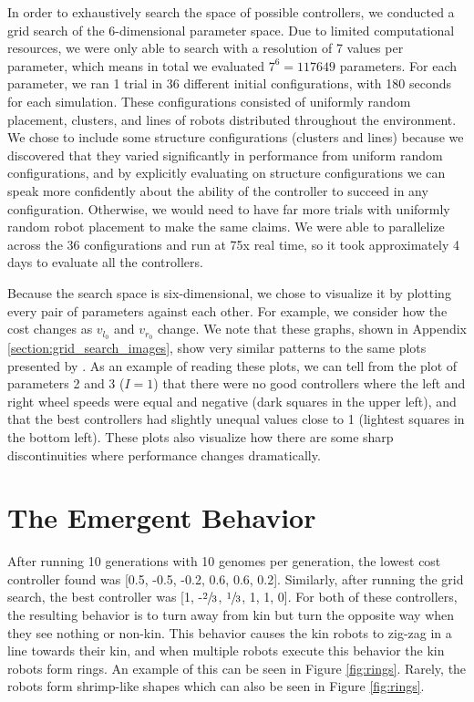 \documentclass[conference]{IEEEtran}
\begin{document}
    In order to exhaustively search the space of possible controllers, we conducted a grid search of the 6-dimensional parameter space. Due to limited computational resources, we were only able to search with a resolution of 7 values per parameter, which means in total we evaluated $7^6=117649$ parameters. For each parameter, we ran 1 trial in 36 different initial configurations, with 180 seconds for each simulation. These configurations consisted of uniformly random placement, clusters, and lines of robots distributed throughout the environment. We chose to include some structure configurations (clusters and lines) because we discovered that they varied significantly in performance from uniform random configurations, and by explicitly evaluating on structure configurations we can speak more confidently about the ability of the controller to succeed in any configuration. Otherwise, we would need to have far more trials with uniformly random robot placement to make the same claims. We were able to parallelize across the 36 configurations and run at 75x real time, so it took approximately 4 days to evaluate all the controllers.

    Because the search space is six-dimensional, we chose to visualize it by plotting every pair of parameters against each other. For example, we consider how the cost changes as $v_{l_0}$ and $v_{r_0}$ change. We note that these graphs, shown in Appendix \ref{section:grid_search_images}, show very similar patterns to the same plots presented by \cite{gauci_self-organized_2014}. As an example of reading these plots, we can tell from the plot of parameters 2 and 3 ($I=1$) that there were no good controllers where the left and right wheel speeds were equal and negative (dark squares in the upper left), and that the best controllers had slightly unequal values close to 1 (lightest squares in the bottom left). These plots also visualize how there are some sharp discontinuities where performance changes dramatically.

\section{The Emergent Behavior}

    After running 10 generations with 10 genomes per generation, the lowest cost controller found was [0.5, -0.5, -0.2, 0.6, 0.6, 0.2]. Similarly, after running the grid search, the best controller was [1, -$\sfrac{2}{3}$, $\sfrac{1}{3}$, 1, 1, 0]. For both of these controllers, the resulting behavior is to turn away from kin but turn the opposite way when they see nothing or non-kin. This behavior causes the kin robots to zig-zag in a line towards their kin, and when multiple robots execute this behavior the kin robots form rings. An example of this can be seen in Figure \ref{fig:rings}. Rarely, the robots form shrimp-like shapes which can also be seen in Figure \ref{fig:rings}.
\end{document}
